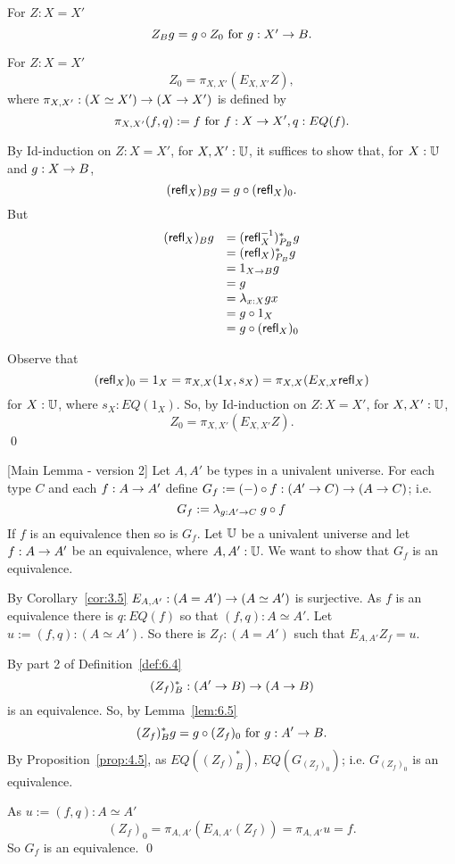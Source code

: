  $\;$\label{lem:6.5}
\item For $Z:X=X'$ 
  \[ Z_Bg = g\circ Z_0 \mbox{ for $g:X'\ra B$}.\]
\item For $Z:X=X'$
  \[ Z_0 = \pi_{X,X'}(E_{X,X'}Z),\] 
where $\pi_{X,X'}:(X\simeq X')\ra (X\ra X')$ is defined by
  \[ \pi_{X,X'}(f,q):=f\mbox{ for } f:X\ra X', q:EQ(f).\]
\proof
{}
\item By Id-induction on $Z:X=X'$, for $X,X':\bbU$, it suffices to show that, for $X:\bbU$ and $g:X\ra B$,
  \[ (\refl{X})_Bg = g\circ(\refl{X})_0.\]
But
  \[\be{array}{ll}
(\refl{X})_Bg 
&= (\refl{X}^{-1})_{P_B}^*g\\
&= (\refl{X})_{P_B}^*g\\
&= 1_{X\ra B}g\\
&= g\\
&= \lambda_{x:X}gx\\
&= g\circ 1_X\\
&= g\circ (\refl{X})_0
\en{array}\]
\item Observe that 
  \[(\refl{X})_0=1_X=\pi_{X,X}(1_X,s_X)=\pi_{X,X}(E_{X,X}\refl{X})\]
for $X:\bbU$, where $s_X:EQ(1_X)$.  So, by Id-induction on $Z:X=X'$, for 
$X,X':\bbU$,
  \[ Z_0 = \pi_{X,X'}(E_{X,X'}Z).\]
\qed

[Main Lemma - version 2]\label{fe:lem-main2}\label{lem:6.6}
Let $A,A'$ be types in a univalent universe.  For each type $C$ and each
$f:A\ra A'$ define
$G_f := (-)\circ f:(A'\ra C)\ra (A\ra C)$;
i.e.
  \[ G_f := \lambda_{g:A'\ra C}\; g\circ f\]
 If $f$ is an equivalence then so is $G_f$.
\proof Let $\bbU$ be a univalent universe and let $f:A\ra A'$ be an 
equivalence, where $A,A':\bbU$.  We want to show that $G_f$ is an equivalence.

By Corollary~\ref{cor:3.5} $E_{A,A'}:(A=A')\ra (A\simeq A')$ is surjective.  
As $f$ is an equivalence there is $q:EQ(f)$ so that $(f,q):A\simeq A'$. Let $u:=(f,q):(A\simeq A')$.  So there is $Z_f:(A=A')$ such that $E_{A,A'}Z_f = u$.

\item[Proof that $G_f$ is an equivalence:]
By part 2 of Definition~\ref{def:6.4} 
  \[ (Z_f)_B^*:(A'\ra B)\ra (A\ra B)\]
is an equivalence.  So, by Lemma~\ref{lem:6.5}
  \[(Z_f)_B^*g = g\circ (Z_f)_0\mbox{ for } g:A'\ra B.\]
By Proposition~\ref{prop:4.5}, as $EQ((Z_f)_B^*)$, $EQ(G_{(Z_f)_0})$; i.e. $G_{(Z_f)_0}$ is an equivalence.

As $u:=(f,q):A\simeq A'$
  \[(Z_f)_0 = \pi_{A,A'}(E_{A,A'}(Z_f)) =\pi_{A,A'}u = f.\]
So $G_f$ is an equivalence.
\qed

